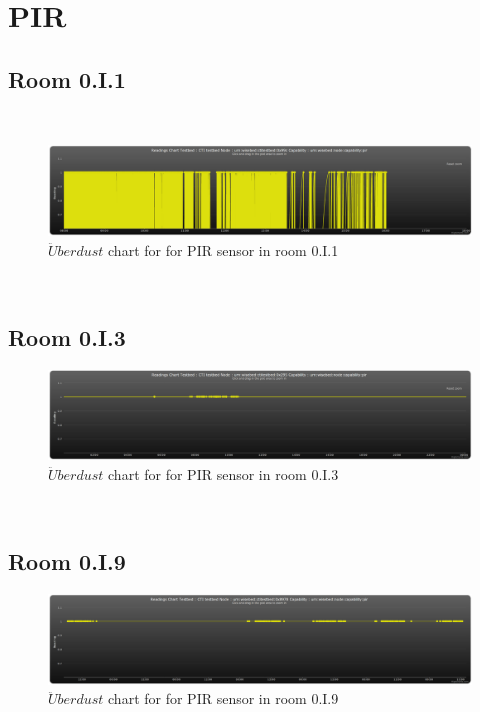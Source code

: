 \documentclass[12pt,a4paper]{report}
\begin{document}
\section{PIR}
%
\subsection{Room 0.I.1}
%
\ \\
\begin{figure}[H]
\centering
	\includegraphics*[width=\textwidth]{pir_1}
	\caption{$\ddot{U}berdust$ chart for for PIR sensor in room 0.I.1}
	\label{chart_pir_1}
\end{figure}
\ \\
%
\subsection{Room 0.I.3}
%
\begin{figure}[H]
\centering
	\includegraphics*[width=\textwidth]{pir_3}
	\caption{$\ddot{U}berdust$ chart for for PIR sensor in room 0.I.3}
	\label{chart_pir_3}
\end{figure}
\ \\
%
\subsection{Room 0.I.9}
%
\begin{figure}[H]
\centering
	\includegraphics*[width=\textwidth]{pir_9}
	\caption{$\ddot{U}berdust$ chart for for PIR sensor in room 0.I.9}
	\label{chart_pir_9}
\end{figure}
\ \\
%
\end{document}
